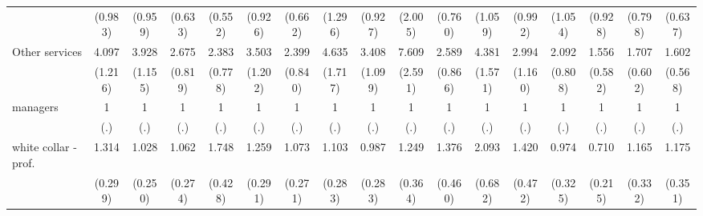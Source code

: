 {\begin{tabular}{l*{16}{c}}
                    &     (0.983)         &     (0.959)         &     (0.633)         &     (0.552)         &     (0.926)         &     (0.662)         &     (1.296)         &     (0.927)         &     (2.005)         &     (0.760)         &     (1.059)         &     (0.992)         &     (1.054)         &     (0.928)         &     (0.798)         &     (0.637)         \\
[1em]
Other services      &       4.097\sym{***}&       3.928\sym{***}&       2.675\sym{**} &       2.383\sym{**} &       3.503\sym{***}&       2.399\sym{*}  &       4.635\sym{***}&       3.408\sym{***}&       7.609\sym{***}&       2.589\sym{**} &       4.381\sym{***}&       2.994\sym{**} &       2.092         &       1.556         &       1.707         &       1.602         \\
                    &     (1.216)         &     (1.155)         &     (0.819)         &     (0.778)         &     (1.202)         &     (0.840)         &     (1.717)         &     (1.099)         &     (2.591)         &     (0.866)         &     (1.571)         &     (1.160)         &     (0.808)         &     (0.582)         &     (0.602)         &     (0.568)         \\
[1em]
managers            &           1         &           1         &           1         &           1         &           1         &           1         &           1         &           1         &           1         &           1         &           1         &           1         &           1         &           1         &           1         &           1         \\
                    &         (.)         &         (.)         &         (.)         &         (.)         &         (.)         &         (.)         &         (.)         &         (.)         &         (.)         &         (.)         &         (.)         &         (.)         &         (.)         &         (.)         &         (.)         &         (.)         \\
[1em]
white collar - prof.&       1.314         &       1.028         &       1.062         &       1.748\sym{*}  &       1.259         &       1.073         &       1.103         &       0.987         &       1.249         &       1.376         &       2.093\sym{*}  &       1.420         &       0.974         &       0.710         &       1.165         &       1.175         \\
                    &     (0.299)         &     (0.250)         &     (0.274)         &     (0.428)         &     (0.291)         &     (0.271)         &     (0.283)         &     (0.283)         &     (0.364)         &     (0.460)         &     (0.682)         &     (0.472)         &     (0.325)         &     (0.215)         &     (0.332)         &     (0.351)         \\

\end{tabular}}
